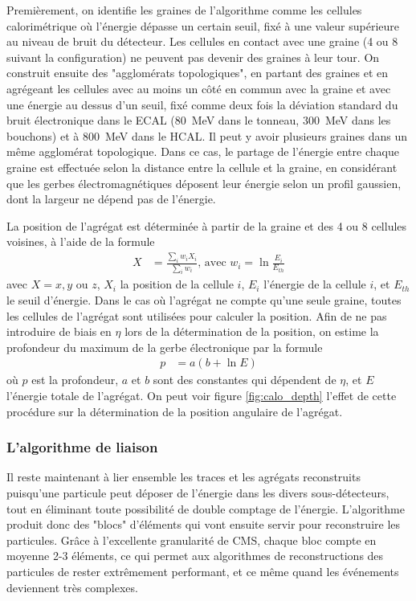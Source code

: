 Premièrement, on identifie les graines de l'algorithme comme les cellules calorimétrique où l'énergie dépasse un certain seuil, fixé à une valeur supérieure au niveau de bruit du détecteur. Les cellules en contact avec une graine (4 ou 8 suivant la configuration) ne peuvent pas devenir des graines à leur tour. On construit ensuite des "agglomérats topologiques", en partant des graines et en agrégeant les cellules avec au moins un côté en commun avec la graine et avec une énergie au dessus d'un seuil, fixé comme deux fois la déviation standard du bruit électronique dans le ECAL (\SI{80}{\MeV} dans le tonneau, \tilde \SI{300}{\MeV} dans les bouchons) et à \SI{800}{\MeV} dans le HCAL. Il peut y avoir plusieurs graines dans un même agglomérat topologique. Dans ce cas, le partage de l'énergie entre chaque graine est effectuée selon la distance entre la cellule et la graine, en considérant que les gerbes électromagnétiques déposent leur énergie selon un profil gaussien, dont la largeur ne dépend pas de l'énergie.

\medskip

La position de l'agrégat est déterminée à partir de la graine et des 4 ou 8 cellules voisines, à l'aide de la formule
\begin{align*}
  X &= \frac{ \sum_i{w_i X_i} }{ \sum_i{w_i} }\text{, avec } w_i = \ln{\frac{E_i}{E_{th}}}
\end{align*}
avec $X = x, y$ ou $z$, $X_i$ la position de la cellule $i$, $E_i$ l'énergie de la cellule $i$, et $E_{th}$ le seuil d'énergie. Dans le cas où l'agrégat ne compte qu'une seule graine, toutes les cellules de l'agrégat sont utilisées pour calculer la position. Afin de ne pas introduire de biais en $\eta$ lors de la détermination de la position, on estime la profondeur du maximum de la gerbe électronique par la formule
\begin{align*}
  p &= a\left( b + \ln{E} \right)
\end{align*}
où $p$ est la profondeur, $a$ et $b$ sont des constantes qui dépendent de $\eta$, et $E$ l'énergie totale de l'agrégat. On peut voir figure \ref{fig:calo_depth} l'effet de cette procédure sur la détermination de la position angulaire de l'agrégat.

\subsubsection{L'algorithme de liaison} \label{sec:pf_links}

Il reste maintenant à lier ensemble les traces et les agrégats reconstruits puisqu'une particule peut déposer de l'énergie dans les divers sous-détecteurs, tout en éliminant toute possibilité de double comptage de l'énergie. L'algorithme produit donc des "blocs" d'éléments qui vont ensuite servir pour reconstruire les particules. Grâce à l'excellente granularité de CMS, chaque bloc compte en moyenne 2-3 éléments, ce qui permet aux algorithmes de reconstructions des particules de rester extrêmement performant, et ce même quand les événements deviennent très complexes.

